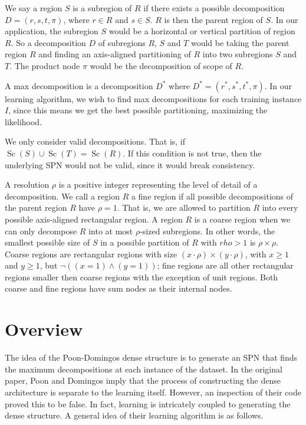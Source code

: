 \documentclass{amsart}
\DeclareMathOperator*{\Sc}{\text{Sc}}
\theoremstyle{plain}
\numberwithin{equation}{section}
\begin{document}
We say a region $S$ is a subregion of $R$ if there exists a possible decomposition $D=(r,s,t,\pi)$,
where $r\in R$ and $s\in S$. $R$ is then the parent region of $S$. In our application, the
subregion $S$ would be a horizontal or vertical partition of region $R$. So a decomposition $D$ of
subregions $R$, $S$ and $T$ would be taking the parent region $R$ and finding an axis-aligned
partitioning of $R$ into two subregions $S$ and $T$. The product node $\pi$ would be the
decomposition of scope of $R$.

A max decomposition is a decomposition $D^*$ where $D^*=(r^*,s^*,t^*,\pi)$. In our learning
algorithm, we wish to find max decompositions for each training instance $I$, since this means we
get the best possible partitioning, maximizing the likelihood.

We only consider valid decompositions. That is, if $\Sc(S)\cup\Sc(T)=\Sc(R)$. If this condition is
not true, then the underlying SPN would not be valid, since it would break consistency.

A resolution $\rho$ is a positive integer representing the level of detail of a decomposition. We
call a region $R$ a fine region if all possible decompositions of the parent region $R$ have
$\rho=1$. That is, we are allowed to partition $R$ into every possible axis-aligned rectangular
region. A region $R$ is a coarse region when we can only decompose $R$ into at most $\rho$-sized
subregions. In other words, the smallest possible size of $S$ in a possible partition of $R$ with
$rho>1$ is $\rho\times\rho$. Coarse regions are rectangular regions with size $(x\cdot\rho)\times
(y\cdot\rho)$, with $x\geq 1$ and $y\geq 1$, but $\neg((x=1)\wedge(y=1))$; fine regions are all
other rectangular regions smaller then coarse regions with the exception of unit regions. Both
coarse and fine regions have sum nodes as their internal nodes.

\section{Overview}

The idea of the Poon-Domingos dense structure is to generate an SPN that finds the maximum
decompositions at each instance of the dataset. In the original paper, Poon and Domingos imply that
the process of constructing the dense architecture is separate to the learning itself. However, an
inspection of their code proved this to be false. In fact, learning is intricately coupled to
generating the dense structure. A general idea of their learning algorithm is as follows.
\end{document}
